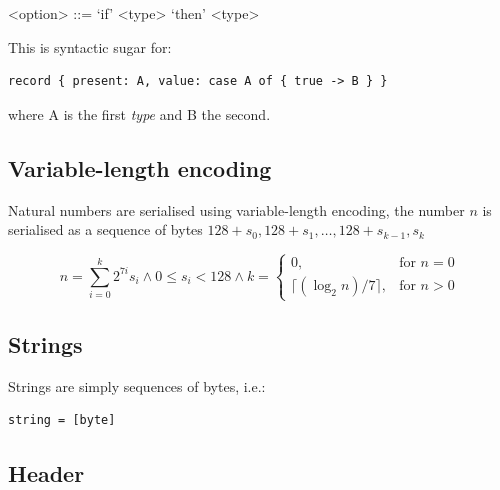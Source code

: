 \documentclass[a4paper,oneside,article]{memoir}
\begin{document}
\begin{grammar}
  <option> ::= `if' <type> `then' <type>
\end{grammar}

This is syntactic sugar for:
\begin{verbatim}
record { present: A, value: case A of { true -> B } }
\end{verbatim}
where A is the first \emph{type} and B the second.

\subsection{Variable-length encoding}

Natural numbers are serialised using variable-length encoding, the number $n$ is serialised as a sequence of bytes $128 + s_0, 128 + s_1, \ldots{}, 128 + s_{k-1}, s_k$

\[
  n = \sum_{i=0}^k 2^{7i}s_i \wedge 0 \leq s_i < 128 \wedge k = \left. \begin{cases}
      0, & \text{for } n = 0 \\
      \lceil (\log_2 n)/7 \rceil, & \text{for } n > 0
      \end{cases} \right.
\]

\subsection{Strings}

Strings are simply sequences of bytes, i.e.:
\begin{verbatim}
string = [byte]
\end{verbatim}

\subsection{Header}
\end{document}
